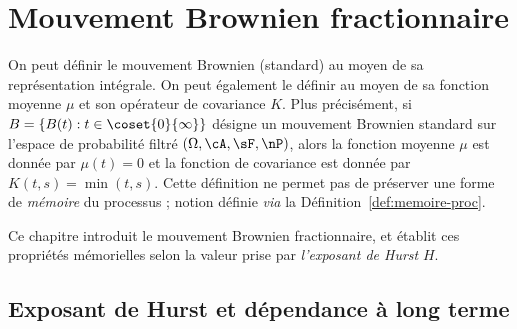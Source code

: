 
\chapter{Mouvement Brownien fractionnaire}

On peut définir le mouvement Brownien (standard) au moyen de sa
représentation intégrale. On peut également le définir au moyen de sa
fonction moyenne $\mu$ et son opérateur de covariance $K$. Plus
précisément, si $B = \{B(t) : t \in \coset{0}{\infty}\}$ désigne un
mouvement Brownien standard sur l'espace de probabilité filtré
$\left(\Omega, \cA, \sF, \nP\right)$, alors la fonction moyenne $\mu$
est donnée par $\mu(t) = 0$ et la fonction de covariance est donnée
par $K(t,s) = \min(t,s)$. Cette définition ne permet pas de préserver
une forme de \emph{\og mémoire \fg{}} du processus ; notion définie
\emph{via} la Définition~\ref{def:memoire-proc}.

Ce chapitre introduit le mouvement Brownien fractionnaire, et établit
ces propriétés mémorielles selon la valeur prise par \emph{l'exposant
de Hurst} $H$. 

\section{Exposant de Hurst et dépendance à long terme}
